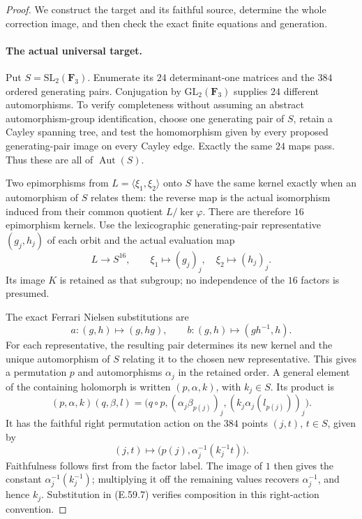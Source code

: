 \begin{proof}
We construct the target and its faithful source, determine the whole
correction image, and then check the exact finite equations and generation.

\paragraph{The actual universal target.}
Put $S=\mathrm{SL}_2(\mathbf F_3)$. Enumerate its $24$ determinant-one
matrices and the $384$ ordered generating pairs. Conjugation by
$\mathrm{GL}_2(\mathbf F_3)$ supplies $24$ different automorphisms.
To verify completeness without assuming an abstract automorphism-group
identification, choose one generating pair of $S$, retain a Cayley
spanning tree, and test the homomorphism given by every proposed
generating-pair image on every Cayley edge. Exactly the same $24$
maps pass. Thus these are all of $\operatorname{Aut}(S)$.

Two epimorphisms from $L=\langle\xi_1,\xi_2\rangle$ onto $S$ have
the same kernel exactly when an automorphism of $S$ relates them:
the reverse map is the actual isomorphism induced from their common
quotient $L/\ker\varphi$. There are therefore $16$ epimorphism kernels.
Use the lexicographic generating-pair representative $(g_j,h_j)$ of
each orbit and the actual evaluation map
\[
 L\longrightarrow S^{16},\qquad
 \xi_1\longmapsto(g_j)_j,\quad
 \xi_2\longmapsto(h_j)_j.
 \tag{E.59.5}
\]
Its image $K$ is retained as that subgroup; no independence of the
$16$ factors is presumed.

The exact Ferrari Nielsen substitutions are
\[
 a:(g,h)\longmapsto(g,hg),\qquad
 b:(g,h)\longmapsto(gh^{-1},h).
 \tag{E.59.6}
\]
For each representative, the resulting pair determines its new
kernel and the unique automorphism of $S$ relating it to the chosen
new representative. This gives a permutation $p$ and automorphisms
$\alpha_j$ in the retained order. A general element of the containing
holomorph is written $(p,\alpha,k)$, with $k_j\in S$. Its product is
\[
 (p,\alpha,k)(q,\beta,l)=
 \bigl(q\circ p,(\alpha_j\beta_{p(j)})_j,
                   (k_j\alpha_j(l_{p(j)}))_j\bigr).
 \tag{E.59.7}
\]
It has the faithful right permutation action on the $384$ points
$(j,t)$, $t\in S$, given by
\[
 (j,t)\longmapsto
       \bigl(p(j),\alpha_j^{-1}(k_j^{-1}t)\bigr).
 \tag{E.59.8}
\]
Faithfulness follows first from the factor label. The image of $1$
then gives the constant $\alpha_j^{-1}(k_j^{-1})$; multiplying it
off the remaining values recovers $\alpha_j^{-1}$, and hence $k_j$.
Substitution
in \textup{(E.59.7)} verifies composition in this right-action convention.


\end{proof}
